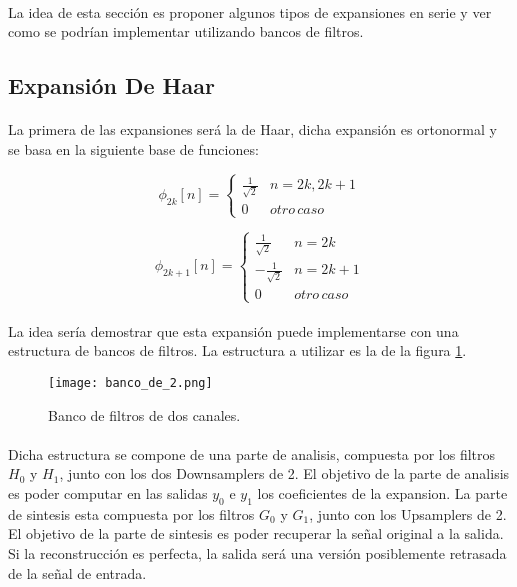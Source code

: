 \paragraph{}
La idea de esta sección es proponer algunos tipos de expansiones en serie y ver como se podrían implementar utilizando bancos de filtros.

\subsection{Expansión De Haar}

\paragraph{}
La primera de las expansiones será la de Haar, dicha expansión es ortonormal y se basa en la siguiente base de funciones:

\[ \phi_{2k}[n] = \begin{cases} 
      \frac{1}{\sqrt{2}} & n = 2 k, 2 k + 1 \\
      0 & otro \, caso
   \end{cases}
\]

\[ \phi_{2k + 1}[n] = \begin{cases} 
      \frac{1}{\sqrt{2}} & n = 2 k \\
      -\frac{1}{\sqrt{2}} & n = 2 k + 1 \\
      0 & otro \, caso
   \end{cases}
\]

\paragraph{}
La idea sería demostrar que esta expansión puede implementarse con una estructura de bancos de filtros. La estructura a utilizar es la de la figura \ref{fig:banco_de_2}.

	\begin{figure}[h!]
		\centering
		\texttt{[image: banco\_de\_2.png]}
		\caption{Banco de filtros de dos canales.}
		\label{fig:banco_de_2}
	\end{figure}
	
\paragraph{}
Dicha estructura se compone de una parte de analisis, compuesta por los filtros $H_{0}$ y $H_{1}$, junto con los dos Downsamplers de 2. El objetivo de la parte de analisis es poder computar en las salidas $y_{0}$ e $y_{1}$ los coeficientes de la expansion. La parte de sintesis esta compuesta por los filtros $G_{0}$ y $G_{1}$, junto con los Upsamplers de 2. El objetivo de la parte de sintesis es poder recuperar la señal original a la salida. Si la reconstrucción es perfecta, la salida será una versión posiblemente retrasada de la señal de entrada.


